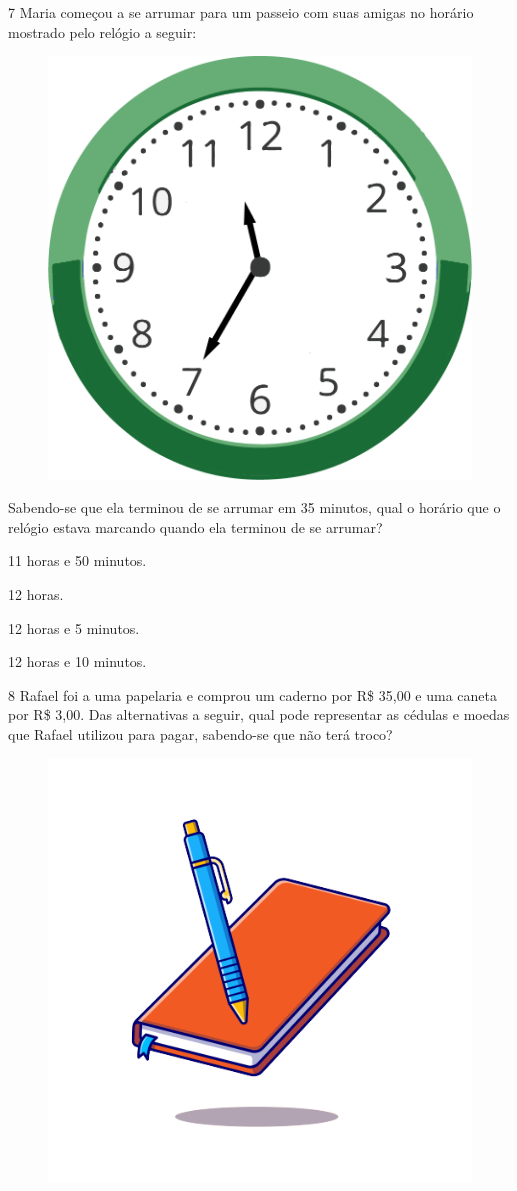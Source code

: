 \num{7} Maria começou a se arrumar para um passeio com suas amigas no horário mostrado pelo relógio a seguir:

\begin{figure}[htpb!]
\centering
\includegraphics[width=.5\textwidth]{./media/image116.png}
\end{figure}

\pagebreak
Sabendo-se que ela terminou de se arrumar em 35 minutos, qual o horário que o relógio estava marcando quando ela terminou de se arrumar?

\begin{escolha}
\item
  11 horas e 50 minutos.
\item
  12 horas.
\item
  12 horas e 5 minutos.
\item
  12 horas e 10 minutos.
\end{escolha}


\num{8} Rafael foi a uma papelaria e comprou um caderno por R\$ 35,00 e uma caneta
por R\$ 3,00. Das alternativas a seguir, qual pode representar as cédulas
e moedas que Rafael utilizou para pagar, sabendo-se que não terá troco?

\begin{figure}[htpb!]
\centering
\includegraphics[width=.5\textwidth]{./media/image116a.png}
\end{figure}

